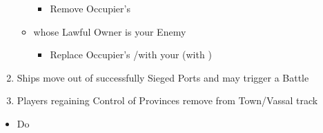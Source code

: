 \documentclass[10pt]{article}
\begin{document}
\begin{enumerate}
\begin{itemize}
		\begin{itemize}
			\item Remove Occupier's \town
		\end{itemize}
		\item {} whose Lawful Owner is your Enemy
		\begin{itemize}
			\item Replace Occupier's \town/\rebeltown with your \town (with \unrest)
		\end{itemize}
	\end{itemize}
	\vfill
	\item Ships move out of successfully Sieged Ports and may trigger a Battle
	\item Players regaining Control of Provinces remove \cubes from Town/Vassal track
\end{enumerate}

\begin{itemize}
	\item Do   
\end{itemize}
\end{document}
